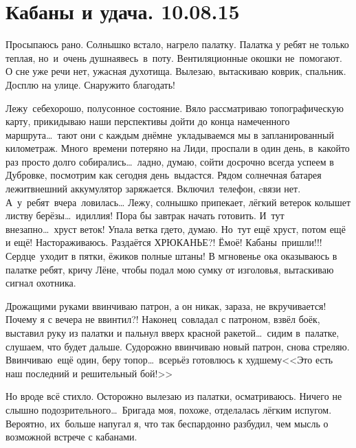 \chapter{Кабаны и удача. 10.08.15}

Просыпаюсь рано. Солнышко встало, нагрело палатку. Палатка у ребят не только теплая, но~и~очень душная\mdash весь~в~поту. Вентиляционные окошки не~помогают. О сне уже речи нет, ужасная духотища. Вылезаю, вытаскиваю коврик, спальник. Досплю на улице. Снаружи\sdash то благодать! 

Лежу~себе\mdash хорошо, полусонное состояние. Вяло рассматриваю топографическую карту, прикидываю наши перспективы дойти до конца намеченного маршрута\ldots~тают они с каждым днём\mdash не~укладываемся мы в запланированный километраж. Много~времени потеряно на Лиди, проспали в один день, в~какой\sdash то раз просто долго собирались\ldots~ладно, думаю, сойти досрочно всегда успеем в Дубровке, посмотрим как сегодня день~выдастся. Рядом солнечная батарея лежит\mdash внешний аккумулятор заряжается. Включил~телефон, cвязи нет. А~у~ребят~вчера~ловилась\ldots 
\newpage
Лежу, солнышко припекает, лёгкий ветерок колышет листву берёзы\ldots~идиллия! Пора бы завтрак начать готовить. И~тут внезапно\ldots~хруст веток! Упала ветка где\sdash то, думаю. Но~тут ещё хруст, потом ещё и ещё! Настораживаюсь. Раздаётся ХРЮКАНЬЕ?! Ё\sdash моё! Кабаны~пришли!!! Сердце~уходит в пятки, ёжиков полные штаны! В мгновенье ока оказываюсь в палатке ребят, кричу Лёне, чтобы подал мою сумку от изголовья, вытаскиваю сигнал охотника. 

Дрожащими руками ввинчиваю патрон, а он никак, зараза, не вкручивается! Почему я с вечера не ввинтил?! Наконец~совладал с патроном, взвёл боёк, выставил руку из палатки и пальнул вверх красной ракетой\ldots~сидим в~палатке, слушаем, что будет дальше. Судорожно ввинчиваю новый патрон, снова стреляю. Ввинчиваю~ещё один, беру топор\ldots~всерьёз готовлюсь к худшему\mdash <<Это есть наш последний и решительный бой!>> 

Но вроде всё стихло. Осторожно вылезаю из палатки, осматриваюсь. Ничего не слышно подозрительного\ldots~Бригада моя, похоже, отделалась лёгким испугом. Вероятно, их~больше напугал я, что так беспардонно разбудил, чем мысль о возможной встрече с кабанами.

